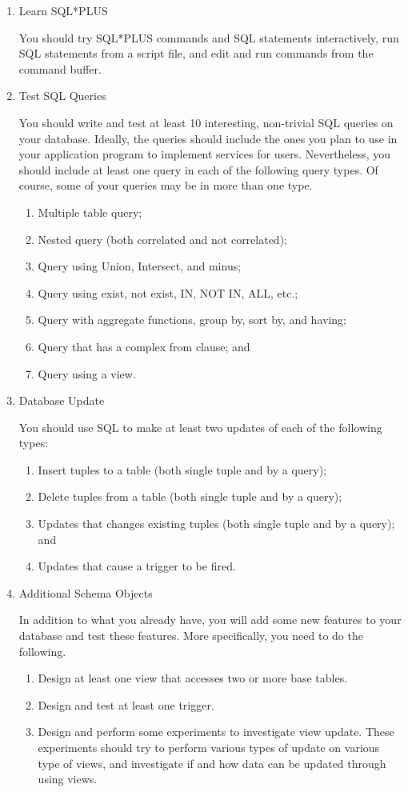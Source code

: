 \documentclass[11pt]{article}
\begin{document}
\begin{enumerate}
\item Learn SQL*PLUS

     You should try SQL*PLUS commands and SQL statements
     interactively, run SQL statements from a script file, and edit
     and run commands from the command buffer.
\item Test SQL Queries

     You should write and test at least 10 interesting, non-trivial
     SQL queries on your database. Ideally, the queries should include
     the ones you plan to use in your application program to implement
     services for users. Nevertheless, you should include at least one
     query in each of the following query types. Of course, some of
     your queries may be in more than one type.
\begin{enumerate}
\item Multiple table query;
\item Nested query (both correlated and not correlated);
\item Query using Union, Intersect, and minus;
\item Query using exist, not exist, IN, NOT IN, ALL, etc.;
\item Query with aggregate functions, group by, sort by, and having;
\item Query that has a complex from clause; and
\item Query using a view.
\end{enumerate}
\item Database Update
     
     You should use SQL to make at least two updates of each of the
     following types:
\begin{enumerate}
\item Insert tuples to a table (both single tuple and by a query);
\item Delete tuples from a table (both single tuple and by a query);
\item Updates that changes existing tuples (both single tuple and by
        a query); and
\item Updates that cause a trigger to be fired.
\end{enumerate}
\item Additional Schema Objects

     In addition to what you already have, you will add some new
     features to your database and test these features. More
     specifically, you need to do the following.
\begin{enumerate}
\item Design at least one view that accesses two or more base tables.
\item Design and test at least one trigger.
\item Design and perform some experiments to investigate view
        update. These experiments should try to perform various types
        of update on various type of views, and investigate if and how
        data can be updated through using views.
\end{enumerate}
\end{enumerate}
\end{document}
